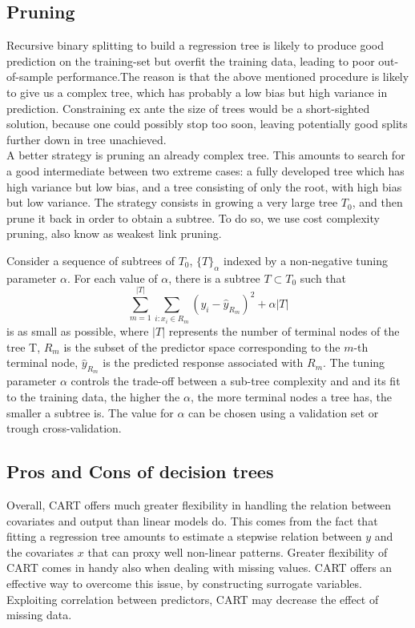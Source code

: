 \documentclass[a4paper,11pt]{article}
\begin{document}
\subsection{Pruning}

Recursive binary splitting to build a regression tree  is likely to produce good prediction on the training-set but overfit the training data, leading to poor out-of-sample performance.The reason is that the above mentioned procedure is likely to give us a complex tree, which has probably a low bias but high variance in prediction. Constraining ex ante the size of trees would be a short-sighted solution, because one could possibly stop too soon, leaving potentially good splits further down in tree unachieved.
\\A better strategy is pruning an already complex tree. This amounts to search for a good intermediate between two extreme cases: a fully developed tree which has high variance but low bias, and a tree consisting of only the root, with high bias but low variance. 
The strategy consists in growing a very large tree $T_0$, and then prune it back in order to obtain a subtree. To do so, we use cost complexity pruning, also know as weakest link pruning.

Consider a sequence of subtrees of $T_0$, $\{T\}_\alpha$ indexed by a non-negative tuning parameter $\alpha$.
For each value of $\alpha$, there is a subtree $T \subset T_0$ such that
$$\sum_{m=1}^{|T|} \sum_{i : x_i \in R_m} \left( y_i - \hat{y}_{R_m} \right)^2 + \alpha |T|$$
is as small as possible, where $|T|$ represents the number of terminal nodes of the tree T, $R_m$ is the subset of the predictor space corresponding to the $m$-th terminal node, $\hat{y}_{R_m}$ is the predicted response associated with $R_m$.
The tuning parameter $\alpha$ controls the trade-off between a sub-tree complexity and and its fit to the training data, the higher the $\alpha$, the more terminal nodes a tree has, the smaller a subtree is.
The value for $\alpha$ can be chosen using a validation set or trough cross-validation.

\subsection{Pros and Cons of decision trees}
Overall, CART offers much greater flexibility in handling the relation between covariates and output than linear models do. This comes from the fact that fitting a regression tree amounts to estimate a stepwise relation between $y$ and the covariates $x$ that can proxy well non-linear patterns. 
Greater flexibility of CART comes in handy also when dealing with missing values. CART offers an effective way to overcome this issue, by constructing surrogate variables. Exploiting correlation between predictors, CART may decrease the effect of missing data. 
\end{document}
